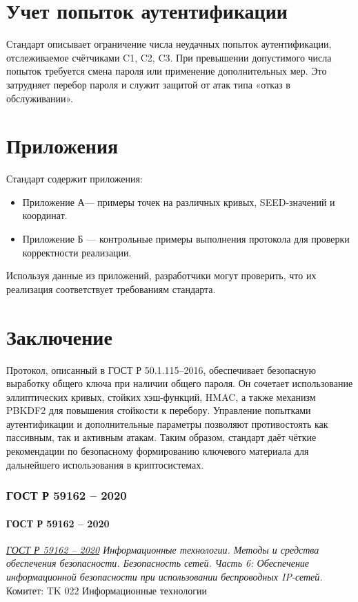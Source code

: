\section*{Учет попыток аутентификации}
\label{sec:counters}
Стандарт описывает ограничение числа неудачных попыток аутентификации, отслеживаемое счётчиками C1, C2, C3. При превышении допустимого числа попыток требуется смена пароля или применение дополнительных мер.
Это затрудняет перебор пароля и служит защитой от атак типа «отказ в обслуживании».

\section*{Приложения}
\label{sec:apps}
Стандарт содержит приложения:
\begin{itemize}
    \item Приложение А--- примеры точек на различных кривых, SEED-значений и координат.
    \item Приложение Б  --- контрольные примеры выполнения протокола для проверки корректности реализации.
\end{itemize}

Используя данные из приложений, разработчики могут проверить, что их реализация соответствует требованиям стандарта.

\section*{Заключение}
Протокол, описанный в ГОСТ Р 50.1.115–2016, обеспечивает безопасную выработку общего ключа при наличии общего пароля.
Он сочетает использование эллиптических кривых, стойких хэш-функций, HMAC, а также механизм PBKDF2 для повышения стойкости к перебору.
Управление попытками аутентификации и дополнительные параметры позволяют противостоять как пассивным, так и активным атакам.
Таким образом, стандарт даёт чёткие рекомендации по безопасному формированию ключевого материала для дальнейшего использования в криптосистемах.



\subsubsection{ГОСТ Р 59162 -- 2020}
\paragraph{ГОСТ Р 59162 -- 2020}
\emph{\href{https://rst.gov.ru:8443/file-service/file/load/1699366818935}{ГОСТ Р 59162 -- 2020}
Информационные технологии.
Методы и средства обеспечения безопасности.
Безопасность сетей. Часть 6: Обеспечение информационной безопасности при использовании беспроводных IP-сетей.}
Комитет: TK 022 Информационные технологии
